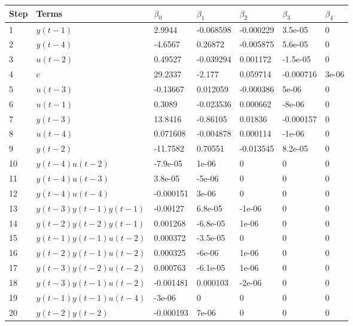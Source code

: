 \begin{tabular}{lllllll}
Step & Terms & $\beta_{0}$ & $\beta_{1}$ & $\beta_{2}$ & $\beta_{3}$ & $\beta_{4}$ \\ 
\hline 
1 & $y(t-1)$ & 2.9944 & -0.068598 & -0.000229 & 3.5e-05 & 0 \\ 
2 & $y(t-4)$ & -4.6567 & 0.26872 & -0.005875 & 5.6e-05 & 0 \\ 
3 & $u(t-2)$ & 0.49527 & -0.039294 & 0.001172 & -1.5e-05 & 0 \\ 
4 & $c$ & 29.2337 & -2.177 & 0.059714 & -0.000716 & 3e-06 \\ 
5 & $u(t-3)$ & -0.13667 & 0.012059 & -0.000386 & 5e-06 & 0 \\ 
6 & $u(t-1)$ & 0.3089 & -0.023536 & 0.000662 & -8e-06 & 0 \\ 
7 & $y(t-3)$ & 13.8416 & -0.86105 & 0.01836 & -0.000157 & 0 \\ 
8 & $u(t-4)$ & 0.071608 & -0.004878 & 0.000114 & -1e-06 & 0 \\ 
9 & $y(t-2)$ & -11.7582 & 0.70551 & -0.013545 & 8.2e-05 & 0 \\ 
10 & $y(t-4)u(t-2)$ & -7.9e-05 & 1e-06 & 0 & 0 & 0 \\ 
11 & $y(t-4)u(t-3)$ & 3.8e-05 & -5e-06 & 0 & 0 & 0 \\ 
12 & $y(t-4)u(t-4)$ & -0.000151 & 3e-06 & 0 & 0 & 0 \\ 
13 & $y(t-3)y(t-1)y(t-1)$ & -0.00127 & 6.8e-05 & -1e-06 & 0 & 0 \\ 
14 & $y(t-2)y(t-2)y(t-1)$ & 0.001268 & -6.8e-05 & 1e-06 & 0 & 0 \\ 
15 & $y(t-1)y(t-1)u(t-2)$ & 0.000372 & -3.5e-05 & 0 & 0 & 0 \\ 
16 & $y(t-2)y(t-1)u(t-2)$ & 0.000325 & -6e-06 & 1e-06 & 0 & 0 \\ 
17 & $y(t-3)y(t-2)u(t-2)$ & 0.000763 & -6.1e-05 & 1e-06 & 0 & 0 \\ 
18 & $y(t-3)y(t-1)u(t-2)$ & -0.001481 & 0.000103 & -2e-06 & 0 & 0 \\ 
19 & $y(t-1)y(t-1)u(t-4)$ & -3e-06 & 0 & 0 & 0 & 0 \\ 
20 & $y(t-2)y(t-2)$ & -0.000193 & 7e-06 & 0 & 0 & 0 \\ 
\hline 
\end{tabular}